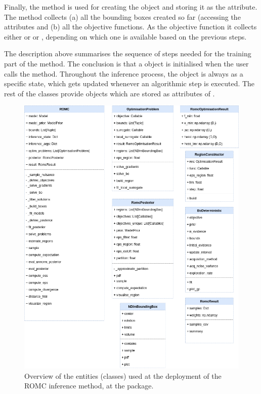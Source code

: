 Finally, the  method is used for creating
the  object and storing it as the
 attribute. The method collects (a) all the
bounding boxes created so far (accessing the
 attributes and (b) all the objective functions. As the objective function it collects either  or \linebreak {} or , depending on which one is available based on the previous steps.

The description above summarises the sequence of steps needed for the
training part of the method. The conclusion is that a 
object is initialised when the user calls the method. Throughout the
inference process, the  object is always as a specific state,
which gets updated whenever an algorithmic step is executed. The rest
of the classes provide objects which are stored as attributes of
.

\begin{figure}[ht]
    \begin{center}
      \includegraphics[width=\textwidth]{./Thesis/graphs/RomcEntityDiagram.png}
    \end{center}
  \caption[Overview of the entities (classes) of the ROMC implementation.]{Overview of the entities (classes) used at the deployment of the ROMC inference method, at the  package.}
  \label{fig:example_training}
\end{figure}


